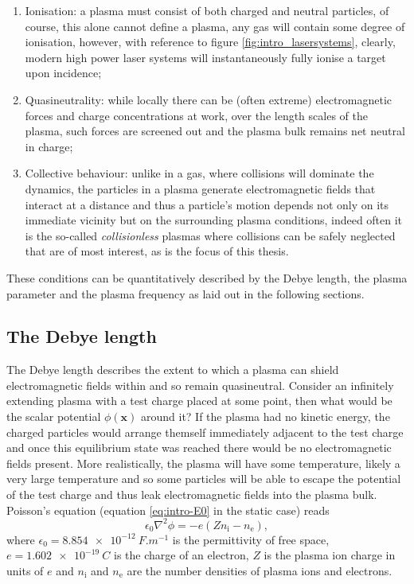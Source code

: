 \begin{enumerate}
	\item Ionisation: a plasma must consist of both charged and neutral particles, of course, this alone cannot define a plasma, any gas will contain some degree of ionisation, however, with reference to figure \ref{fig:intro_lasersystems}, clearly, modern high power laser systems will instantaneously fully ionise a target upon incidence;
	\item Quasineutrality: while locally there can be (often extreme) electromagnetic forces and charge concentrations at work, over the length scales of the plasma, such forces are screened out and the plasma bulk remains net neutral in charge;
	\item Collective behaviour: unlike in a gas, where collisions will dominate the dynamics, the particles in a plasma generate electromagnetic fields that interact at a distance and thus a particle's motion depends not only on its immediate vicinity but on the surrounding plasma conditions, indeed often it is the so-called \textit{collisionless} plasmas where collisions can be safely neglected that are of most interest, as is the focus of this thesis.
\end{enumerate}

These conditions can be quantitatively described by the Debye length, the plasma parameter and the plasma frequency as laid out in the following sections.

\subsection{\label{sec:debye_length}The Debye length}
The Debye length describes the extent to which a plasma can shield electromagnetic fields within and so remain quasineutral. Consider an infinitely extending plasma with a test charge placed at some point, then what would be the scalar potential $\phi(\mathbf{x})$ around it? If the plasma had no kinetic energy, the charged particles would arrange themself immediately adjacent to the test charge and once this equilibrium state was reached there would be no electromagnetic fields present. More realistically, the plasma will have some temperature, likely a very large temperature and so some particles will be able to escape the potential of the test charge and thus leak electromagnetic fields into the plasma bulk. Poisson's equation (equation \ref{eq:intro-E0} in the static case) reads
\begin{equation}\label{eq:poisson}
	\epsilon_0\nabla^2\phi = -e(Zn_\mathrm{i} - n_\mathrm{e}),
\end{equation}
where $\epsilon_0 = \qty{8.854e-12}{F.m^{-1}}$ is the permittivity of free space, $e = \qty{1.602e-19}{C}$ is the charge of an electron, $Z$ is the plasma ion charge in units of $e$ and $n_\mathrm{i}$ and $n_\mathrm{e}$ are the number densities of plasma ions and electrons.

